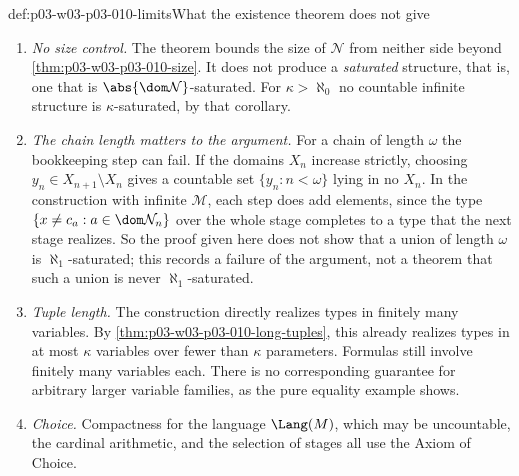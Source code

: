 \begin{hbwarning}{def:p03-w03-p03-010-limits}{What the existence theorem does not give}
\begin{enumerate}
  \item \emph{No size control.}  The theorem bounds the size of
        \(\mathcal N\) from neither side beyond
        \cref{thm:p03-w03-p03-010-size}.  It does not produce a
        \emph{saturated} structure, that is, one that is
        \(\abs{\dom\mathcal N}\)-saturated.  For
        \(\kappa>\aleph_0\) no countable infinite structure is
        \(\kappa\)-saturated, by that corollary.
  \item \emph{The chain length matters to the argument.}  For a chain of
        length \(\omega\) the bookkeeping step can fail.  If the
        domains \(X_n\) increase strictly, choosing
        \(y_n\in X_{n+1}\setminus X_n\) gives a countable set
        \(\{y_n:n<\omega\}\) lying in no \(X_n\).  In the construction
        with infinite \(\mathcal M\), each step does add elements, since
        the type \(\{x\ne c_a:a\in\dom\mathcal N_n\}\) over the whole
        stage completes to a type that the next stage realizes.  So the
        proof given here does not show that a union of length \(\omega\)
        is \(\aleph_1\)-saturated; this records a failure of the argument,
        not a theorem that such a union is never \(\aleph_1\)-saturated.
  \item \emph{Tuple length.} The construction directly realizes types
        in finitely many variables. By
        \cref{thm:p03-w03-p03-010-long-tuples}, this already realizes
        types in at most \(\kappa\) variables over fewer than
        \(\kappa\) parameters. Formulas still involve finitely many
        variables each. There is no corresponding guarantee for arbitrary
        larger variable families, as the pure equality example shows.
  \item \emph{Choice.}  Compactness for the language \(\Lang(M)\), which
        may be uncountable, the cardinal arithmetic, and the selection of
        stages all use the Axiom of Choice.
\end{enumerate}
\end{hbwarning}

